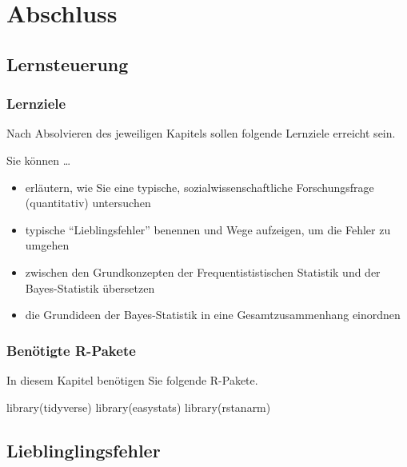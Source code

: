 \documentclass[
  a4paper,
  DIV=11]{scrreprt}
\newenvironment{Shaded}{\begin{snugshade}}{\end{snugshade}}
\newcommand{\FunctionTok}[1]{\textcolor[rgb]{0.28,0.35,0.67}{#1}}
\newcommand{\NormalTok}[1]{\textcolor[rgb]{0.00,0.23,0.31}{#1}}
\providecommand{\tightlist}{%
  \setlength{\itemsep}{0pt}\setlength{\parskip}{0pt}}\usepackage{longtable,booktabs,array}
\theoremstyle{definition}
\theoremstyle{remark}
\begin{document}

\hypertarget{abschluss-1}{%
\chapter{Abschluss}\label{abschluss-1}}

\hypertarget{lernsteuerung-10}{%
\section{Lernsteuerung}\label{lernsteuerung-10}}

\hypertarget{lernziele-11}{%
\subsection{Lernziele}\label{lernziele-11}}

Nach Absolvieren des jeweiligen Kapitels sollen folgende Lernziele
erreicht sein.

Sie können \ldots{}

\begin{itemize}
\tightlist
\item
  erläutern, wie Sie eine typische, sozialwissenschaftliche
  Forschungsfrage (quantitativ) untersuchen
\item
  typische ``Lieblingsfehler'' benennen und Wege aufzeigen, um die
  Fehler zu umgehen
\item
  zwischen den Grundkonzepten der Frequentististischen Statistik und der
  Bayes-Statistik übersetzen
\item
  die Grundideen der Bayes-Statistik in eine Gesamtzusammenhang
  einordnen
\end{itemize}

\hypertarget{benuxf6tigte-r-pakete-6}{%
\subsection{Benötigte R-Pakete}\label{benuxf6tigte-r-pakete-6}}

In diesem Kapitel benötigen Sie folgende R-Pakete.

\begin{Shaded}
\begin{Highlighting}[]
\FunctionTok{library}\NormalTok{(tidyverse)}
\FunctionTok{library}\NormalTok{(easystats)}
\FunctionTok{library}\NormalTok{(rstanarm)}
\end{Highlighting}
\end{Shaded}

\hypertarget{lieblinglingsfehler}{%
\section{Lieblinglingsfehler}\label{lieblinglingsfehler}}
\end{document}

